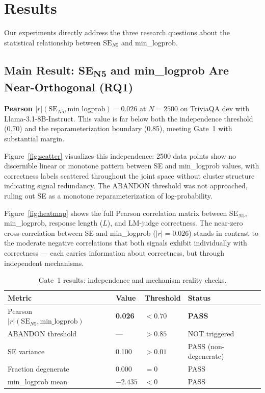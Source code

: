 \section{Results}
\label{sec:results}

Our experiments directly address the three research questions about the statistical relationship between $\text{SE}_{N5}$ and min\_logprob.

\subsection{Main Result: SE\textsubscript{N5} and min\_logprob Are Near-Orthogonal (RQ1)}

\textbf{Pearson $|r|(\text{SE}_{N5}, \text{min\_logprob}) = 0.026$} at $N=2500$ on TriviaQA dev with Llama-3.1-8B-Instruct. This value is far below both the independence threshold (0.70) and the reparameterization boundary (0.85), meeting Gate~1 with substantial margin.

Figure~\ref{fig:scatter} visualizes this independence: 2500 data points show no discernible linear or monotone pattern between SE and min\_logprob values, with correctness labels scattered throughout the joint space without cluster structure indicating signal redundancy. The ABANDON threshold was not approached, ruling out SE as a monotone reparameterization of log-probability.

Figure~\ref{fig:heatmap} shows the full Pearson correlation matrix between $\text{SE}_{N5}$, min\_logprob, response length ($L$), and LM-judge correctness. The near-zero cross-correlation between SE and min\_logprob ($|r|=0.026$) stands in contrast to the moderate negative correlations that both signals exhibit individually with correctness --- each carries information about correctness, but through independent mechanisms.

\begin{table}[h]
\centering
\caption{Gate~1 results: independence and mechanism reality checks.}
\label{tab:gate1}
\begin{tabular}{llll}
\toprule
\textbf{Metric} & \textbf{Value} & \textbf{Threshold} & \textbf{Status} \\
\midrule
Pearson $|r|(\text{SE}_{N5}, \text{min\_logprob})$ & \textbf{0.026} & $< 0.70$ & \textbf{PASS} \\
ABANDON threshold & --- & $> 0.85$ & NOT triggered \\
SE variance & 0.100 & $> 0.01$ & PASS (non-degenerate) \\
Fraction degenerate & 0.000 & $= 0$ & PASS \\
min\_logprob mean & $-2.435$ & $< 0$ & PASS \\
\bottomrule
\end{tabular}
\end{table}

